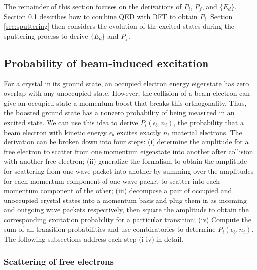 \documentclass[twoside,twocolumn,9pt]{article}
\begin{document}
The remainder of this section focuses on the derivations of $P_i$, $P_f$, and
$\{E_d\}$.
Section \ref{sec:probability} describes how to combine QED with DFT to obtain
$P_i$.
Section \ref{sec:sputtering} then considers the evolution of the excited states
during the sputtering process to derive $\{E_d\}$ and $P_f$.

\subsection{Probability of beam-induced excitation} 
\label{sec:probability}

For a crystal in its ground state, an occupied electron
energy eigenstate has zero overlap with any unoccupied state.
However, the collision of a beam electron can give an occupied state a
momentum boost that breaks this orthogonality.
Thus, the boosted ground state has a nonzero probability of being measured in
an excited state.
We can use this idea to derive $P_i(\epsilon_b, n_i)$, the probability that a
beam electron with kinetic energy $\epsilon_b$ excites exactly $n_i$ material
electrons.
The derivation can be broken down into four steps:
(i)
determine the amplitude for a free electron to scatter from one momentum
eigenstate into another after collision with another free electron;
(ii)
generalize the formalism to obtain the amplitude for scattering from one wave
packet into another by summing over the amplitudes for each momentum component
of one wave packet to scatter into each momentum component of the other;
(iii)
decompose a pair of occupied and unoccupied crystal states into a momentum
basis and plug them in as incoming and outgoing wave packets respectively, then
square the amplitude to obtain the corresponding excitation probability for a
particular transition;
(iv)
Compute the sum of all transition probabilities and use combinatorics to
determine $P_i(\epsilon_b, n_i)$.
The following subsections address each step (i-iv) in detail.

\subsubsection{Scattering of free electrons} 
\label{sec:ee}
\end{document}
